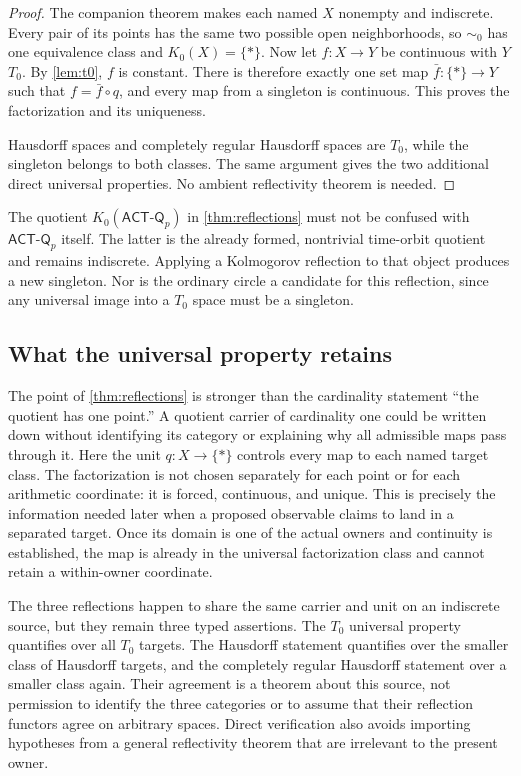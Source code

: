 \documentclass[11pt]{article}
\theoremstyle{definition}
\newcommand{\ACTQ}{\mathsf{ACT\mbox{-}Q}_p}
\newcommand{\Kzero}{K_0}
\begin{document}
\begin{proof}
The companion theorem makes each named $X$ nonempty and indiscrete.  Every pair of its points has the same two possible open neighborhoods, so $\sim_0$ has one equivalence class and $\Kzero(X)=\{*\}$.  Now let $f:X\to Y$ be continuous with $Y$ $T_0$.  By \cref{lem:t0}, $f$ is constant.  There is therefore exactly one set map $\bar f:\{*\}\to Y$ such that $f=\bar f\circ q$, and every map from a singleton is continuous.  This proves the factorization and its uniqueness.

Hausdorff spaces and completely regular Hausdorff spaces are $T_0$, while the singleton belongs to both classes.  The same argument gives the two additional direct universal properties.  No ambient reflectivity theorem is needed.
\end{proof}

The quotient $\Kzero(\ACTQ)$ in \cref{thm:reflections} must not be confused with $\ACTQ$ itself.  The latter is the already formed, nontrivial time-orbit quotient and remains indiscrete.  Applying a Kolmogorov reflection to that object produces a new singleton.  Nor is the ordinary circle a candidate for this reflection, since any universal image into a $T_0$ space must be a singleton.

\subsection{What the universal property retains}

The point of \cref{thm:reflections} is stronger than the cardinality statement ``the quotient has one point.''  A quotient carrier of cardinality one could be written down without identifying its category or explaining why all admissible maps pass through it.  Here the unit $q:X\to\{*\}$ controls every map to each named target class.  The factorization is not chosen separately for each point or for each arithmetic coordinate: it is forced, continuous, and unique.  This is precisely the information needed later when a proposed observable claims to land in a separated target.  Once its domain is one of the actual owners and continuity is established, the map is already in the universal factorization class and cannot retain a within-owner coordinate.

The three reflections happen to share the same carrier and unit on an indiscrete source, but they remain three typed assertions.  The $T_0$ universal property quantifies over all $T_0$ targets.  The Hausdorff statement quantifies over the smaller class of Hausdorff targets, and the completely regular Hausdorff statement over a smaller class again.  Their agreement is a theorem about this source, not permission to identify the three categories or to assume that their reflection functors agree on arbitrary spaces.  Direct verification also avoids importing hypotheses from a general reflectivity theorem that are irrelevant to the present owner.
\end{document}
